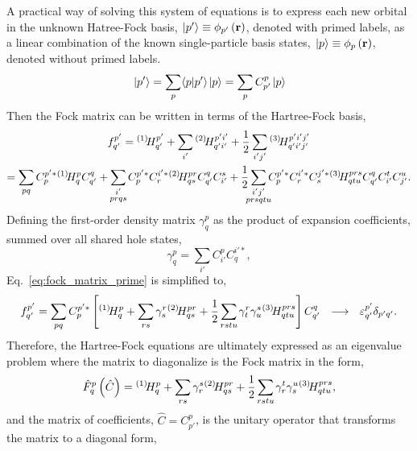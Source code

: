 \documentclass[thesis.tex]{subfiles}
\begin{document}
A practical way of solving this system of equations is to express each new orbital in the unknown Hatree-Fock basis, $\hspace{1pt}\lvert p' \rangle \equiv \phi_{p'}\left(\mathbf{r}\right)$, denoted with primed labels, as a linear combination of the known single-particle basis states, $\hspace{1pt}\lvert p \rangle \equiv \phi_{p}\left(\mathbf{r}\right)$, denoted without primed labels.
\begin{equation} \label{eq:fock_matrix_prime}
  \hspace{1pt}\lvert p' \rangle = \sum_{p}\langle p | p'\rangle\hspace{1pt}\lvert p \rangle = \sum_{p}C^{p}_{p'}\hspace{1pt}\lvert p \rangle
\end{equation}
Then the Fock matrix can be written in terms of the Hartree-Fock basis,
\begin{gather}
  \fint{p'}{q'} = \Hint{1}{p'}{q'} + \sum_{\mathclap{i'}}\Hint{2}{p'i'}{q'i'} + \frac{1}{2}\sum_{\mathclap{i'j'}}\Hint{3}{p'i'j'}{q'i'j'} \notag \\
  = \sum_{\mathclap{pq}}C^{p'*}_{p}\Hint{1}{p}{q}C^{q}_{q'} + \sum_{\mathclap{\substack{i' \\ prqs}}}C^{p'*}_{p}C^{i'*}_{r}\Hint{2}{pr}{qs}C^{q}_{q'}C^{s}_{i'} + \frac{1}{2}\sum_{\mathclap{\substack{i'j' \\ prsqtu}}}C^{p'*}_{p}C^{i'*}_{r}C^{j'*}_{s}\Hint{3}{prs}{qtu}C^{q}_{q'}C^{t}_{i'}C^{u}_{j'}.
\end{gather}
Defining the first-order density matrix $\gamma^{p}_{q}$ as the product of expansion coefficients, summed over all shared hole states,
\begin{equation}
  \gamma^{p}_{q} = \sum_{i'}C^{p}_{i'}C^{i'*}_{q},
\end{equation}
Eq.\ \eqref{eq:fock_matrix_prime} is simplified to,
\begin{equation}
  \fint{p'}{q'} = \sum_{\mathclap{pq}}C^{p'*}_{p}\left[ \Hint{1}{p}{q} + \sum_{\mathclap{rs}}\gamma^{r}_{s}\Hint{2}{pr}{qs} + \frac{1}{2}\sum_{\mathclap{rstu}}\gamma^{r}_{t}\gamma^{s}_{u}\Hint{3}{prs}{qtu} \right]C^{q}_{q'}\ \ \longrightarrow\ \ \varepsilon^{p'}_{q'}\delta_{p'q'}.
\end{equation}
Therefore, the Hartree-Fock equations are ultimately expressed as an eigenvalue problem where the matrix to diagonalize is the Fock matrix in the form,
\begin{equation}
  \hat{F}^{p}_{q}\left(\hat{C}\right) = \Hint{1}{p}{q} + \sum_{\mathclap{rs}}\gamma^{s}_{r}\Hint{2}{pr}{qs} + \frac{1}{2}\sum_{\mathclap{rstu}}\gamma^{t}_{r}\gamma^{u}_{s}\Hint{3}{prs}{qtu},
\end{equation}
and the matrix of coefficients, $\hat{C} = C^{p}_{p'}$, is the unitary operator that transforms the matrix to a diagonal form,
\end{document}
